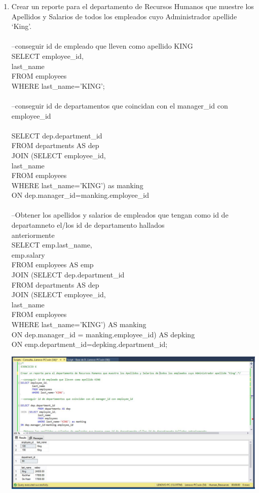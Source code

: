 \begin{enumerate}[1.]
	\item Crear un reporte para el departamento de Recursos Humanos que muestre los Apellidos y Salarios de todos los empleados cuyo Administrador apellide ‘King’.
	\\
	\\--conseguir id de empleado que lleven como apellido KING
	\\SELECT employee\_id,
	\\		last\_name
	\\		FROM employees
	\\		WHERE last\_name='KING';
	\\
	\\--conseguir id de departamentos que coincidan con el manager\_id con employee\_id
	\\
	\\SELECT dep.department\_id
	\\			FROM departments AS dep
	\\JOIN (SELECT employee\_id,
	\\			last\_name
	\\			FROM employees
	\\			WHERE last\_name='KING') as manking
	\\ON dep.manager\_id=manking.employee\_id
	\\
	\\--Obtener los apellidos y salarios de empleados que tengan como id de departamneto el/los id de departamento hallados \\anteriormente
	\\SELECT emp.last\_name,
	\\		emp.salary
	\\		FROM employees AS emp
	\\JOIN (SELECT dep.department\_id
	\\		FROM departments AS dep
	\\JOIN (SELECT employee\_id,
	\\		last\_name
	\\		FROM employees	
	\\		WHERE last\_name='KING') AS manking
	\\	ON dep.manager\_id = manking.employee\_id) AS depking
	\\ON emp.department\_id=depking.department\_id; \\

	\begin{center}
	\includegraphics[width=17cm]{./Imagenes/Actividad9-Ejercicio06} 
	\end{center}


\end{enumerate}

